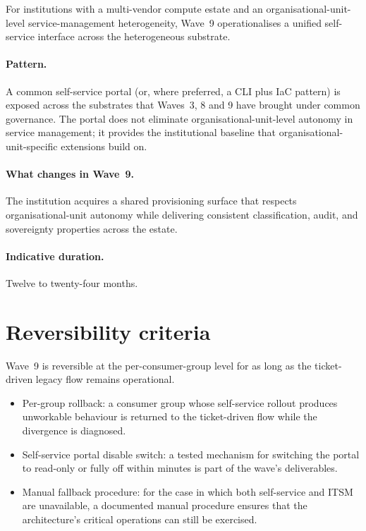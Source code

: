 For institutions with a multi-vendor compute estate and an
organisational-unit-level service-management heterogeneity, Wave~9
operationalises a unified self-service interface across the
heterogeneous substrate.

\paragraph{Pattern.} A common self-service portal (or, where
preferred, a CLI plus IaC pattern) is exposed across the
substrates that Waves~3, 8 and 9 have brought under common
governance. The portal does not eliminate organisational-unit-level
autonomy in service management; it provides the institutional
baseline that organisational-unit-specific extensions build on.

\paragraph{What changes in Wave~9.} The institution acquires a
shared provisioning surface that respects organisational-unit
autonomy while delivering consistent classification, audit, and
sovereignty properties across the estate.

\paragraph{Indicative duration.} Twelve to twenty-four months.

\section{Reversibility criteria}
\label{sec:w9-reversibility}

Wave~9 is reversible at the per-consumer-group level for as
long as the ticket-driven legacy flow remains operational.

\begin{itemize}[leftmargin=1.5em,nosep]
  \item Per-group rollback: a consumer group whose self-service
    rollout produces unworkable behaviour is returned to the
    ticket-driven flow while the divergence is diagnosed.
  \item Self-service portal disable switch: a tested mechanism
    for switching the portal to read-only or fully off within
    minutes is part of the wave's deliverables.
  \item Manual fallback procedure: for the case in which both
    self-service and ITSM are unavailable, a documented manual
    procedure ensures that the architecture's critical
    operations can still be exercised.
\end{itemize}

